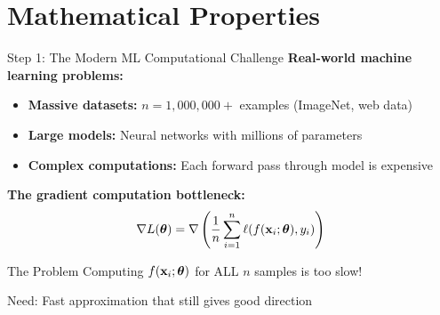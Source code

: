\documentclass[usenames,dvipsnames]{beamer}
\begin{document}
  \section{Mathematical Properties}

  \begin{frame}{Step 1: The Modern ML Computational Challenge}
    \textbf{Real-world machine learning problems:}
    
    \begin{itemize}[<+->]
        \item \textbf{Massive datasets:} $n = 1,000,000+$ examples (ImageNet, web data)
        \item \textbf{Large models:} Neural networks with millions of parameters
        \item \textbf{Complex computations:} Each forward pass through model is expensive
    \end{itemize}
    
    \pause
    \textbf{The gradient computation bottleneck:}
    $$\nabla L(\boldsymbol{\theta}) = \nabla \left(\frac{1}{n}\sum_{i=1}^n \ell(f(\mathbf{x}_i;\boldsymbol{\theta}),y_i)\right)$$
    
    \pause
    \begin{alertbox}{The Problem}
    Computing $f(\mathbf{x}_i;\boldsymbol{\theta})$ for ALL $n$ samples is too slow!
    
    Need: Fast approximation that still gives good direction
    \end{alertbox}
  \end{frame}
\end{document}
